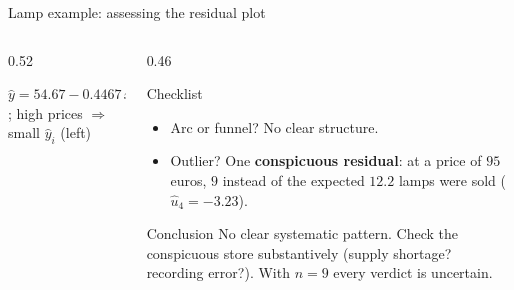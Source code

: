 \documentclass[aspectratio=169,11pt]{beamer}
\def\lampreslist{18.9333/1.0667,16.7/0.3,14.4667/0.5333,12.2333/-3.2333,10/1,7.7667/0.2333,5.5333/-1.5333,3.3/0.7,1.0667/0.9333}
\newcommand{\residualplotof}[1]{%
  \foreach \px/\py in #1 {%
    \edef\tmpdraw{\noexpand\draw[hsbirot!70, line width=1.2pt] (axis cs:\px,0) -- (axis cs:\px,\py);
      \noexpand\fill[hsbiblau] (axis cs:\px,\py) circle[radius=2.2pt];}%
    \tmpdraw
  }}
\begin{document}
\begin{frame}{Lamp example: assessing the residual plot}
  \begin{columns}[T]
    \begin{column}{0.52\textwidth}
      \begin{center}\footnotesize
        $\hat{y} = 54.67 - 0.4467\,x$; high prices $\Rightarrow$ small
        $\hat{y}_i$ (left)
      \end{center}
    \end{column}
    \begin{column}{0.46\textwidth}
      \small
      \begin{block}{Checklist}
        \begin{itemize}
          \item Arc or funnel? No clear structure.
          \item Outlier? One \textbf{conspicuous residual}: at a price of
                $95$ euros, $9$ instead of the expected $12.2$ lamps were sold
                ($\hat{u}_4 = -3.23$).
        \end{itemize}
      \end{block}
      \begin{exampleblock}{Conclusion}
        No clear systematic pattern. Check the conspicuous store substantively
        (supply shortage? recording error?). With $n = 9$ every verdict is
        uncertain.
      \end{exampleblock}
    \end{column}
  \end{columns}
\end{frame}
\end{document}
